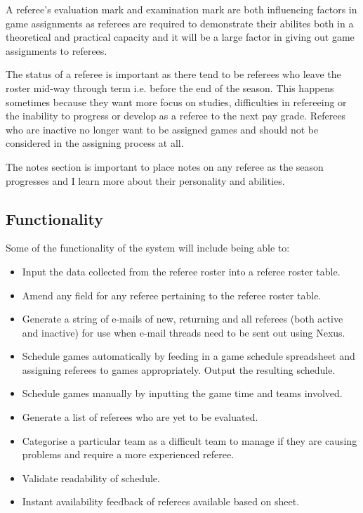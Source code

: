 \documentclass{article}
\begin{document}
A referee's evaluation mark and examination mark are both influencing factors in game assignments as referees are required to demonstrate their abilites both in a theoretical and practical capacity and it will be a large factor in giving out game assignments to referees.

The status of a referee is important as there tend to be referees who leave the roster mid-way through term i.e. before the end of the season. This happens sometimes because they want more focus on studies, difficulties in refereeing or the inability to progress or develop as a referee to the next pay grade. Referees who are inactive no longer want to be assigned games and should not be considered in the assigning process at all.

The notes section is important to place notes on any referee as the season progresses and I learn more about their personality and abilities.

\subsection{Functionality}
Some of the functionality of the system will include being able to:
\begin{itemize}
\item Input the data collected from the referee roster into a referee roster table.
\item Amend any field for any referee pertaining to the referee roster table.
\item Generate a string of e-mails of new, returning and all referees (both active and inactive) for use when e-mail threads need to be sent out using Nexus.
\item Schedule games automatically by feeding in a game schedule spreadsheet and assigning referees to games appropriately. Output the resulting schedule.
\item Schedule games manually by inputting the game time and teams involved.
\item Generate a list of referees who are yet to be evaluated.
\item Categorise a particular team as a difficult team to manage if they are causing problems and require a more experienced referee.
\item Validate readability of schedule.
\item Instant availability feedback of referees available based on sheet.
\end{itemize}
\end{document}
